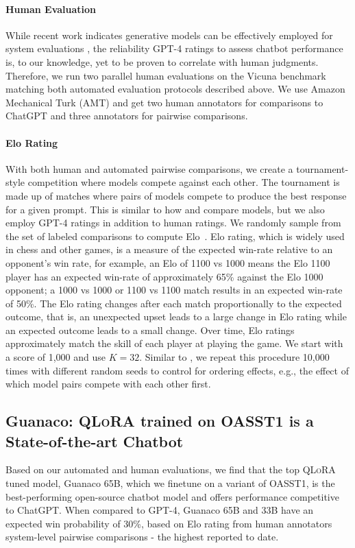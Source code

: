 \paragraph{Human Evaluation} While recent work indicates generative models can be effectively employed for system evaluations \citep{fu2023gptscore}, the reliability GPT-4 ratings to assess chatbot performance is, to our knowledge, yet to be proven to correlate with human judgments. Therefore, we run two parallel human evaluations on the Vicuna benchmark matching both automated evaluation protocols described above. We use Amazon Mechanical Turk (AMT) and get two human annotators for comparisons to ChatGPT and three annotators for pairwise comparisons. 

\paragraph{Elo Rating} With both human and automated pairwise comparisons, we create a tournament-style competition where models compete against each other. The tournament is made up of matches where pairs of models compete to produce the best response for a given prompt. This is similar to how \citet{bai2022training} and \citet{vicuna2023} compare models, but we also employ GPT-4 ratings in addition to human ratings. We randomly sample from the set of labeled comparisons to compute Elo~\citep{elo1967proposed,elo1978rating}. Elo rating, which is widely used in chess and other games, is a measure of the expected win-rate relative to an opponent's win rate, for example, an Elo of 1100 vs 1000 means the Elo 1100 player has an expected win-rate of approximately 65\% against the Elo 1000 opponent; a 1000 vs 1000 or 1100 vs 1100 match results in an expected win-rate of 50\%. The Elo rating changes after each match proportionally to the expected outcome, that is, an unexpected upset leads to a large change in Elo rating while an expected outcome leads to a small change. Over time, Elo ratings approximately match the skill of each player at playing the game. We start with a score of 1,000 and use $K=32$. Similar to \citet{vicuna2023}, we repeat this procedure 10,000 times with different random seeds to control for ordering effects, e.g., the effect of which model pairs compete with each other first.

\subsection{\textbf{Guanaco}: \textsc{QLoRA} trained on OASST1 is a State-of-the-art Chatbot} Based on our automated and human evaluations, we find that the top \textsc{QLoRA} tuned model, {Guanaco} 65B, which we finetune on a variant of OASST1, is the best-performing open-source chatbot model and offers performance competitive to ChatGPT. When compared to GPT-4, {Guanaco} 65B and 33B have an expected win probability of 30\%, based on Elo rating from human annotators system-level pairwise comparisons - the highest reported to date.

